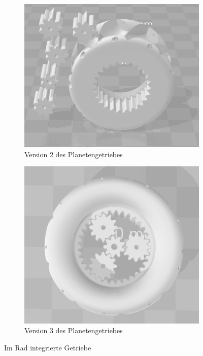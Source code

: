 \begin{figure}[H]
	\centering
	\begin{subfigure}[b]{0.4\textwidth}
		\includegraphics[width=\textwidth]{bilder/GetriebeVersion3-1.png}
		\caption{Version 2 des Planetengetriebes}
		\label{bild:gearversion3-1}
	\end{subfigure}
	\hspace{0.1\textwidth}%
	\begin{subfigure}[b]{0.4\textwidth}
		\includegraphics[width=\textwidth]{bilder/GetriebeVersion3-2.png}
		\caption{Version 3 des Planetengetriebes}
		\label{bild:gearversion3-2}
	\end{subfigure}
	\caption{Im Rad integrierte Getriebe}
	\label{bild:getrgerade}
\end{figure}


